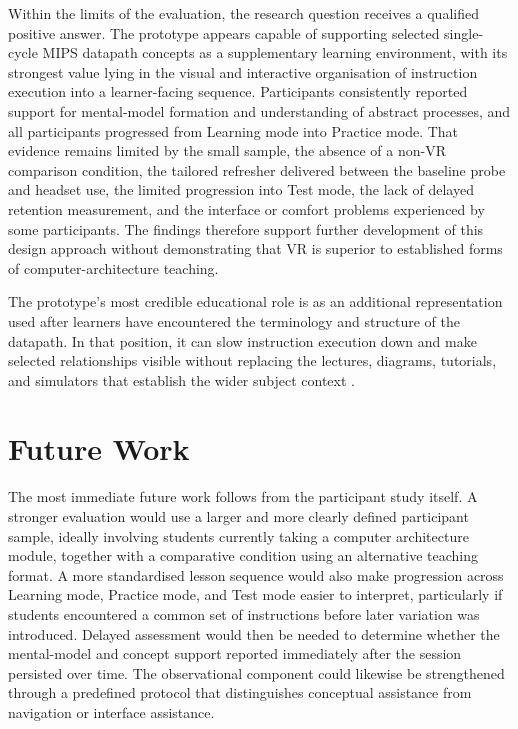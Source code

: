 Within the limits of the evaluation, the research question receives a qualified positive answer. The prototype appears capable of supporting selected single-cycle MIPS datapath concepts as a supplementary learning environment, with its strongest value lying in the visual and interactive organisation of instruction execution into a learner-facing sequence. Participants consistently reported support for mental-model formation and understanding of abstract processes, and all participants progressed from Learning mode into Practice mode. That evidence remains limited by the small sample, the absence of a non-VR comparison condition, the tailored refresher delivered between the baseline probe and headset use, the limited progression into Test mode, the lack of delayed retention measurement, and the interface or comfort problems experienced by some participants. The findings therefore support further development of this design approach without demonstrating that VR is superior to established forms of computer-architecture teaching.

The prototype's most credible educational role is as an additional representation used after learners have encountered the terminology and structure of the datapath. In that position, it can slow instruction execution down and make selected relationships visible without replacing the lectures, diagrams, tutorials, and simulators that establish the wider subject context \cite{janani2026virtual,dengel2020important}.

\section{Future Work}

The most immediate future work follows from the participant study itself. A stronger evaluation would use a larger and more clearly defined participant sample, ideally involving students currently taking a computer architecture module, together with a comparative condition using an alternative teaching format. A more standardised lesson sequence would also make progression across Learning mode, Practice mode, and Test mode easier to interpret, particularly if students encountered a common set of instructions before later variation was introduced. Delayed assessment would then be needed to determine whether the mental-model and concept support reported immediately after the session persisted over time. The observational component could likewise be strengthened through a predefined protocol that distinguishes conceptual assistance from navigation or interface assistance.

